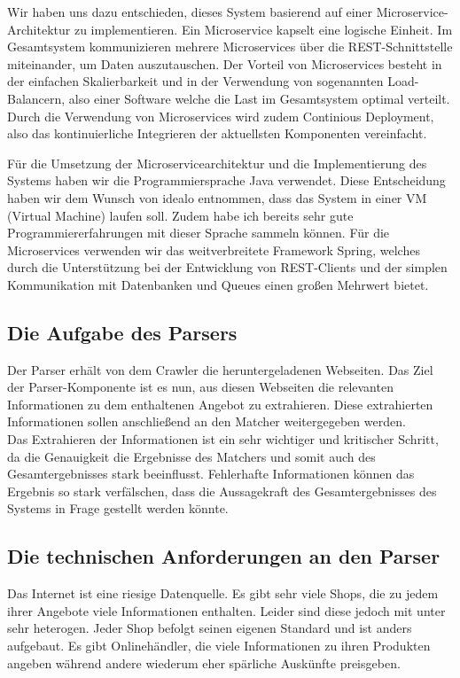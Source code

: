 Wir haben uns dazu entschieden, dieses System basierend auf einer Microservice-Architektur zu implementieren.
Ein Microservice kapselt eine logische Einheit.
Im Gesamtsystem kommunizieren mehrere Microservices über die REST-Schnittstelle miteinander, um Daten auszutauschen.
Der Vorteil von Microservices besteht in der einfachen Skalierbarkeit und in der Verwendung von sogenannten
Load-Balancern, also einer Software welche die Last im Gesamtsystem optimal verteilt.
Durch die Verwendung von Microservices wird zudem Continious Deployment, also das kontinuierliche Integrieren der
aktuellsten Komponenten vereinfacht.

Für die Umsetzung der Microservicearchitektur und die Implementierung des Systems haben wir die Programmiersprache
Java verwendet.
Diese Entscheidung haben wir dem Wunsch von idealo entnommen, dass das System in einer VM (Virtual Machine) laufen soll.
Zudem habe ich bereits sehr gute Programmiererfahrungen mit dieser Sprache sammeln können.
Für die Microservices verwenden wir das weitverbreitete Framework Spring, welches durch die Unterstützung bei der
Entwicklung von REST-Clients und der simplen Kommunikation mit Datenbanken und Queues einen großen Mehrwert bietet.

\subsection{Die Aufgabe des Parsers}

Der Parser erhält von dem Crawler die heruntergeladenen Webseiten.
Das Ziel der Parser-Komponente ist es nun, aus diesen Webseiten die relevanten Informationen zu dem enthaltenen
Angebot zu extrahieren.
Diese extrahierten Informationen sollen anschließend an den Matcher weitergegeben werden.\\
Das Extrahieren der Informationen ist ein sehr wichtiger und kritischer Schritt, da die Genauigkeit die Ergebnisse
des Matchers und somit auch des Gesamtergebnisses stark beeinflusst.
Fehlerhafte Informationen können das Ergebnis so stark verfälschen, dass die Aussagekraft des Gesamtergebnisses des
Systems in Frage gestellt werden könnte.

\subsection{Die technischen Anforderungen an den Parser}

Das Internet ist eine riesige Datenquelle.
Es gibt sehr viele Shops, die zu jedem ihrer Angebote viele Informationen enthalten.
Leider sind diese jedoch mit unter sehr heterogen.
Jeder Shop befolgt seinen eigenen Standard und ist anders aufgebaut.
Es gibt Onlinehändler, die viele Informationen zu ihren Produkten angeben während andere wiederum eher spärliche
Auskünfte preisgeben.

